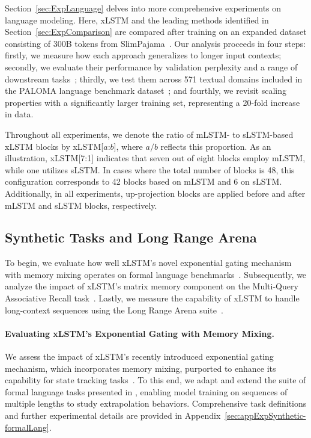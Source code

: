 Section~\ref{sec:ExpLanguage} delves into more comprehensive experiments on language modeling. Here, xLSTM and the leading methods identified in Section~\ref{sec:ExpComparison} are compared after training on an expanded dataset consisting of 300B tokens from SlimPajama~\citep{Soboleva:23}. Our analysis proceeds in four steps: firstly, we measure how each approach generalizes to longer input contexts; secondly, we evaluate their performance by validation perplexity and a range of downstream tasks~\citep{Sutawika:24}; thirdly, we test them across 571 textual domains included in the PALOMA language benchmark dataset~\citep{Magnusson:23arxivshort}; and fourthly, we revisit scaling properties with a significantly larger training set, representing a 20-fold increase in data.

\label{sec:xlstm_blocks_notation}
Throughout all experiments, we denote the ratio of mLSTM- to sLSTM-based xLSTM blocks by xLSTM[$a$:$b$], where $a/b$ reflects this proportion. As an illustration, xLSTM[7:1] indicates that seven out of eight blocks employ mLSTM, while one utilizes sLSTM. In cases where the total number of blocks is 48, this configuration corresponds to 42 blocks based on mLSTM and 6 on sLSTM. Additionally, in all experiments, up-projection blocks are applied before and after mLSTM and sLSTM blocks, respectively.

\subsection{Synthetic Tasks and Long Range Arena}
\label{sec:ExpSyntethic}
To begin, we evaluate how well xLSTM's novel exponential gating mechanism with memory mixing operates on formal language benchmarks~\citep{Deletang:23}. Subsequently, we analyze the impact of xLSTM's matrix memory component on the Multi-Query Associative Recall task~\citep{Arora:23arxiv}. Lastly, we measure the capability of xLSTM to handle long-context sequences using the Long Range Arena suite~\citep{Tay:21}.

\paragraph{Evaluating xLSTM’s Exponential Gating with Memory Mixing.} We assess the impact of xLSTM’s recently introduced exponential gating mechanism, which incorporates memory mixing, purported to enhance its capability for state tracking tasks~\citep{Merrill:24, Merrill:23}. To this end, we adapt and extend the suite of formal language tasks presented in \citet{Deletang:23}, enabling model training on sequences of multiple lengths to study extrapolation behaviors. Comprehensive task definitions and further experimental details are provided in Appendix~\ref{sec:appExpSynthetic-formalLang}. 


